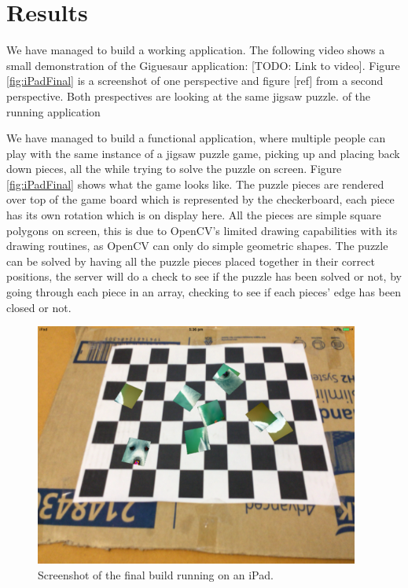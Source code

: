 \documentclass{article}
\begin{document}

\section{Results}

We have managed to build a working application. The following video shows a
small demonstration of the Giguesaur application: [TODO: Link to video]. Figure
\ref{fig:iPadFinal} is a screenshot of one perspective and figure [ref] from a
second perspective. Both prespectives are looking at the same jigsaw puzzle. of
the running application

 We have managed to build a functional application, where multiple people can
 play with the same instance of a jigsaw puzzle game, picking up and placing
 back down pieces, all the while trying to solve the puzzle on screen. Figure
 \ref{fig:iPadFinal} shows what the game looks like. The puzzle pieces are
 rendered over top of the game board which is represented by the checkerboard,
 each piece has its own rotation which is on display here. All the pieces are
 simple square polygons on screen, this is due to OpenCV's limited drawing
 capabilities with its drawing routines, as OpenCV can only do simple geometric
 shapes. The puzzle can be solved by having all the puzzle pieces placed
 together in their correct positions, the server will do a check to see if the
 puzzle has been solved or not, by going through each piece in an array,
 checking to see if each pieces' edge has been closed or not.

\begin{figure}[ht]
\begin{center}
\includegraphics[width=0.95\textwidth]{images/iPadFinalImage}
\caption{Screenshot of the final build running on an iPad.}
\label{fig:iPadFinal1}
\end{center}
\end{figure}
\end{document}
